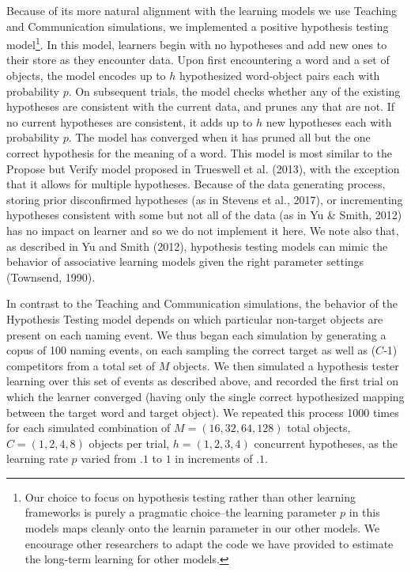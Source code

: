 \documentclass[english,,man,floatsintext]{apa6}
\begin{document}
Because of its more natural alignment with the learning models we use Teaching and Communication simulations, we implemented a positive hypothesis testing model\footnote{Our choice to focus on hypothesis testing rather than other learning frameworks is purely a pragmatic choice--the learning parameter \(p\) in this models maps cleanly onto the learnin parameter in our other models. We encourage other researchers to adapt the code we have provided to estimate the long-term learning for other models.}. In this model, learners begin with no hypotheses and add new ones to their store as they encounter data. Upon first encountering a word and a set of objects, the model encodes up to \(h\) hypothesized word-object pairs each with probability \(p\). On subsequent trials, the model checks whether any of the existing hypotheses are consistent with the current data, and prunes any that are not. If no current hypotheses are consistent, it adds up to \(h\) new hypotheses each with probability \(p\). The model has converged when it has pruned all but the one correct hypothesis for the meaning of a word. This model is most similar to the Propose but Verify model proposed in Trueswell et al. (2013), with the exception that it allows for multiple hypotheses. Because of the data generating process, storing prior disconfirmed hypotheses (as in Stevens et al., 2017), or incrementing hypotheses consistent with some but not all of the data (as in Yu \& Smith, 2012) has no impact on learner and so we do not implement it here. We note also that, as described in Yu and Smith (2012), hypothesis testing models can mimic the behavior of associative learning models given the right parameter settings (Townsend, 1990).

In contrast to the Teaching and Communication simulations, the behavior of the Hypothesis Testing model depends on which particular non-target objects are present on each naming event. We thus began each simulation by generating a copus of 100 naming events, on each sampling the correct target as well as (\(C\)-1) competitors from a total set of \(M\) objects. We then simulated a hypothesis tester learning over this set of events as described above, and recorded the first trial on which the learner converged (having only the single correct hypothesized mapping between the target word and target object). We repeated this process 1000 times for each simulated combination of \(M = (16, 32, 64, 128)\) total objects, \(C = (1,2,4,8)\) objects per trial, \(h = (1, 2, 3, 4)\) concurrent hypotheses, as the learning rate \(p\) varied from \(.1\) to \(1\) in increments of \(.1\).
\end{document}
